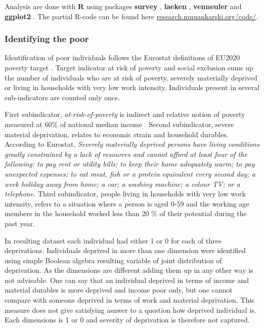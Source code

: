\documentclass[11pt, a4paper]{article}\usepackage{graphicx, color}
\begin{document}
Analysis are done with \textbf{R} \citep{R_2012} using packages \textbf{survey} \citep{survey_2012}, \textbf{laeken} \citep{laeken_2012}, \textbf{venneuler} \citep{venneuler_2011} and \textbf{ggplot2} \citep{ggplot_2009}. The partial R-code can be found here \href{http://research.muuankarski.org/code/}{research.muuankarski.org/code/}.

\subsubsection*{Identifying the poor}

Identification of poor individuals follows the Eurostat definitions of EU2020 poverty target \citep{atkinson_income_2010}. Target indicator at risk of poverty and social exclusion sums up the number of individuals who are at risk of poverty, severely materially deprived or living in households with very low work intensity. Individuals present in several sub-indicators are counted only once.

First subindicator, \textit{at-risk-of-poverty} is indirect and relative notion of poverty measured at 60\% of national median income \citet{atkinson_social_2002}. Second subindicator, severe material deprivation, relates to economic strain and household durables. According to Eurostat, \emph{Severely materially deprived persons have living conditions greatly constrained by a lack of resources and cannot afford at least four of the following: to pay rent or utility bills; to keep their home adequately warm; to pay unexpected expenses; to eat meat, fish or a protein equivalent every second day; a week holiday away from home; a car; a washing machine; a colour TV; or a telephone.} Third subindicator, people living in households with very low work intensity, refers to a situation where a person is aged 0-59 and the working age members in the household worked less than 20 \% of their potential during the past year.

In resulting dataset each individual had either 1 or 0 for each of three deprivations. Individuals deprived in more than one dimension were identified using simple Boolean algebra resulting variable of joint distribution of deprivation. As the dimensions are different adding them up in any other way is not advisable. One can say that an individual deprived in terms of income and material durables is more deprived and income poor only, but one cannot compare with someone deprived in terms of work and material deprivation. This measure does not give satisfying asnwer to a question how deprived individual is. Each dimensions is 1 or 0 and severity of deprivation is therefore not captured.
\end{document}
